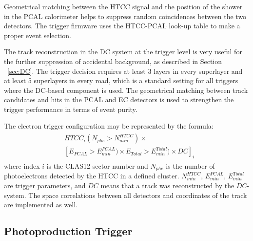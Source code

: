 Geometrical matching between the HTCC signal and the position of the shower in the PCAL calorimeter helps to suppress
random coincidences between the two detectors. The trigger firmware uses the HTCC-PCAL look-up table to make a proper event selection.

The track reconstruction in the DC system at the trigger level is very useful for the further suppression of accidental background, as described in Section ~\ref{sec:DC}. The trigger decision requires at least 3 layers in every superlayer and at least 5 superlayers in every road, which is a standard setting for all triggers where the DC-based component is used. The geometrical matching between track candidates and hits in the PCAL and EC detectors is used to strengthen the trigger performance in terms of event purity.

The electron trigger configuration may be represented by the formula:
\begin{align} 
\label{eq:em_trg_formula}
\begin{split}
 & HTCC_i(N_{phe}{>}N^{HTCC}_{min})\times\\
 & [E_{PCAL}{>}E^{PCAL}_{min}) \times E_{Total}{>}E^{Total}_{min})\times  DC]_i
 \end{split}
\end{align}
\noindent
where index $i$ is the CLAS12 sector number and $N_{phe}$ is the number of photoelectrons detected by the HTCC in a defined cluster. $N^{HTCC}_{min}$,  $E^{PCAL}_{min}$, $ E^{Total}_{min}$ are trigger parameters, and $DC$ means that  a track was reconstructed by the $DC$-system. The space correlations between all detectors and coordinates of the track are implemented as well.


\subsection{Photoproduction Trigger}
\label{sec:photoproduction_trigger}

